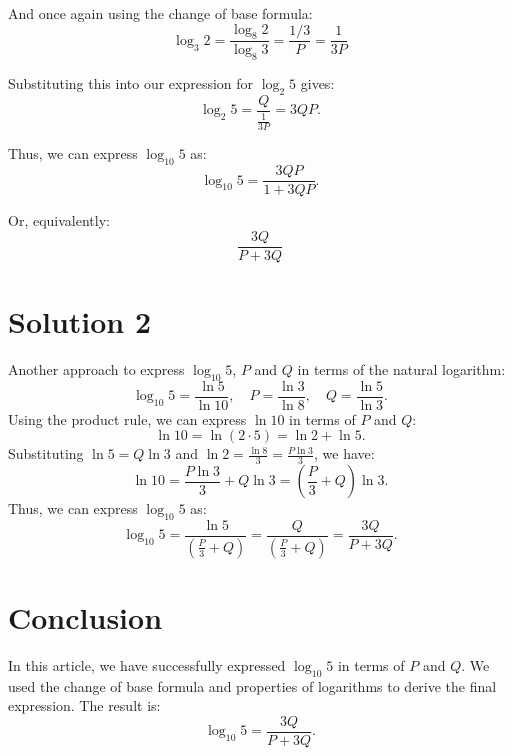 \documentclass{article}
\begin{document}
And once again using the change of base formula:
\[
\log_3 2 = \frac{\log_8 2}{\log_8 3} = \frac{1/3}{P} = \frac{1}{3P}
\]

Substituting this into our expression for $\log_2 5$ gives:
\[
\log_2 5 = \frac{Q}{\frac{1}{3P}} = 3QP.
\]

Thus, we can express $\log_{10} 5$ as:
\[
\log_{10} 5 = \frac{3QP}{1 + 3QP}.
\]

Or, equivalently:
\[
\frac{3Q}{P + 3Q}
\]

\section*{Solution 2}
Another approach to express $\log_{10} 5$, $P$ and $Q$ in terms of the natural logarithm:
\[
\log_{10} 5 = \frac{\ln 5}{\ln 10}, \quad P = \frac{\ln 3}{\ln 8}, \quad Q = \frac{\ln 5}{\ln 3}.
\]
Using the product rule, we can express $\ln 10$ in terms of $P$ and $Q$:
\[
\ln 10 = \ln (2 \cdot 5) = \ln 2 + \ln 5.
\]
Substituting $\ln 5 = Q \ln 3$ and $\ln 2 = \frac{\ln 8}{3} = \frac{P \ln 3}{3}$, we have:
\[
\ln 10 = \frac{P \ln 3}{3} + Q \ln 3 = \left(\frac{P}{3} + Q\right) \ln 3.
\]
Thus, we can express $\log_{10} 5$ as:
\[
\log_{10} 5 = \frac{\ln{5}}{\left(\frac{P}{3} + Q\right)} = \frac{Q}{\left(\frac{P}{3} + Q\right)} = \frac{3Q}{P + 3Q}.
\]

\section*{Conclusion}
In this article, we have successfully expressed $\log_{10} 5$ in terms of $P$ and $Q$. We used the change of base formula and properties of logarithms to derive the final expression. The result is:
\[
\log_{10} 5 = \frac{3Q}{P + 3Q}.
\]
\end{document}
